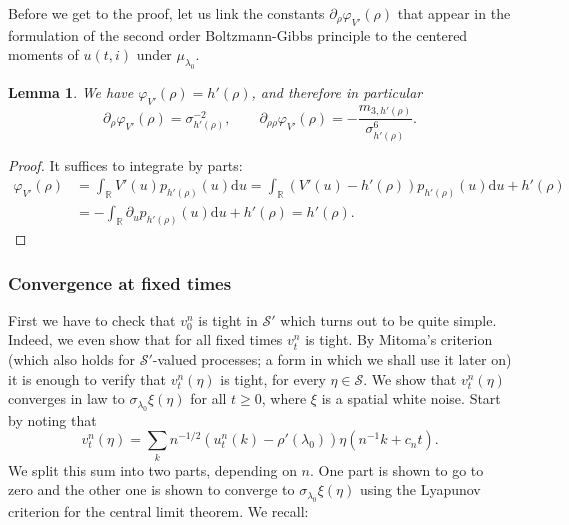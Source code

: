 \documentclass[11pt, a4paper]{article}
\newtheorem{lemma}[theorem]{Lemma}
\newcommand{\CS}{\mathscr{S}}
\newcommand{\dd}{\mathrm{d}}
\newcommand{\R}{\mathbb{R}}
\newcommand{\1}{\mathbf{1}}
\begin{document}
Before we get to the proof, let us link the constants $\partial_\rho \varphi_{V'}(\rho)$ that appear in the formulation of the second order Boltzmann-Gibbs principle to the centered moments of $u(t,i)$ under $\mu_{\lambda_0}$.

\begin{lemma}\label{lem:constants}
   We have $\varphi_{V'}(\rho) = h'(\rho)$, and therefore in particular
   \[
      \partial_{\rho} \varphi_{V'}(\rho) = \sigma_{h'(\rho)}^{-2}, \qquad \partial_{\rho\rho} \varphi_{V'}(\rho) = -\frac{m_{3,h'(\rho)}}{\sigma_{h'(\rho)}^6}.
   \]
\end{lemma}

\begin{proof}
   It suffices to integrate by parts:
   \begin{align*}
      \varphi_{V'}(\rho) & = \int_\R V'(u) p_{h'(\rho)}(u) \dd u = \int_\R ( V'(u) - h'(\rho)) p_{h'(\rho)}(u) \dd u + h'(\rho) \\
      & = - \int_\R \partial_u p_{h'(\rho)}(u) \dd u + h'(\rho) = h'(\rho).
   \end{align*}
\end{proof}

\subsubsection{Convergence at fixed times}\label{sec:fixedTimes}

First we have to check that $v^n_0$ is tight in $\CS'$ which turns out to be
quite simple. Indeed, we even show that for all fixed times $v^n_t$ is tight.
By Mitoma's criterion \cite{bib:mitoma} (which also holds for
$\CS'$-valued processes; a form in which we shall use it later on) it is
enough to verify that $v^n_t (\eta)$ is tight, for every $\eta \in \CS .$ We
show that $v^n_t (\eta)$ converges in law to $\sigma_{\lambda_0} \xi
(\eta)$ for all $t \geqslant 0$, where $\xi$ is a spatial white noise. Start by noting that
\[ v^n_t (\eta) = \sum_k n^{- 1 / 2} (u^n_t (k) - \rho' (\lambda_0)) \eta
   (n^{- 1} k + c_n t) . \]
We split this sum into two parts, depending on $n$. One part is shown to go to
zero and the other one is shown to converge to $\sigma_{\lambda_0} \xi (\eta)$
using the Lyapunov criterion for the central limit theorem. We recall:
\end{document}
